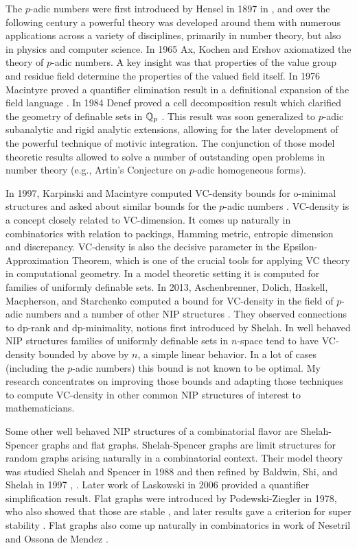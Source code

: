 The $p$-adic numbers were first introduced by Hensel in 1897 in \cite{hensel}, and over the following century a powerful theory was developed around them with numerous applications across a variety of disciplines, primarily in number theory, but also in physics and computer science.
In 1965 Ax, Kochen \cite{ak1} and Ershov \cite{er1} axiomatized the theory of $p$-adic numbers. 
A key insight was that properties of the value group and residue field determine the properties of the valued field itself.
In 1976 Macintyre proved a quantifier elimination result in a definitional expansion of the field language \cite{mac76}.
In 1984 Denef proved a cell decomposition result which clarified the geometry of definable sets in $\mathbb{Q}_p$ \cite{den84}.
This result was soon generalized to $p$-adic subanalytic and rigid analytic extensions, allowing for the later development of the powerful technique of motivic integration.
The conjunction of those model theoretic results allowed to solve a number of outstanding open problems in number theory (e.g., Artin's Conjecture on $p$-adic homogeneous forms).

In 1997, Karpinski and Macintyre computed VC-density bounds for o-minimal structures and asked about similar bounds for the $p$-adic numbers \cite{karp97}.
VC-density is a concept closely related to VC-dimension.
It comes up naturally in combinatorics with relation to packings, Hamming metric, entropic dimension and discrepancy.
 VC-density is also the decisive parameter in the Epsilon-Approximation Theorem, which is one of the crucial tools for applying VC theory in computational geometry.
In a model theoretic setting it is computed for families of uniformly definable sets.
 In 2013, Aschenbrenner, Dolich, Haskell, Macpherson, and Starchenko computed a bound for VC-density in the field of $p$-adic numbers and a number of other NIP structures \cite{density}.
They observed connections to dp-rank and dp-minimality, notions first introduced by Shelah.
In well behaved NIP structures families of uniformly definable sets in $n$-space
tend to have VC-density bounded by above by $n$, a simple linear behavior.
In a lot of cases (including the $p$-adic numbers) this bound is not known to be optimal.
My research concentrates on improving those bounds and adapting those techniques to compute VC-density in other common NIP structures of interest to mathematicians.

Some other well behaved NIP structures of a combinatorial flavor are Shelah-Spencer graphs and flat graphs.
Shelah-Spencer graphs are limit structures for random graphs arising naturally in a combinatorial context.
Their model theory was studied Shelah and Spencer in 1988 \cite{spencer} and then refined by Baldwin, Shi, and Shelah in 1997 \cite{shi}, \cite{baldwin}.
Later work of Laskowski in 2006 \cite{laskowski} provided a quantifier simplification result.
 Flat graphs were introduced by Podewski-Ziegler in 1978, who also showed that those are stable \cite{stable_graphs}, and later results gave a criterion for super stability \cite{ultraflat}.
Flat graphs also come up naturally in combinatorics in work of Nesetril and Ossona de Mendez \cite{nowhere}.

